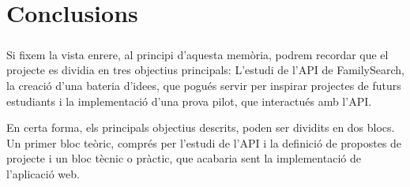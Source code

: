 \chapter{Conclusions}

    \paragraph{}
    Si fixem la vista enrere, al principi d'aquesta memòria, podrem recordar que el projecte es dividia en tres objectius principals: L'estudi de l'API de FamilySearch, la creació d'una bateria d'idees, que pogués servir per inspirar projectes de futurs estudiants i la implementació d'una prova pilot, que interactués amb l'API.

    En certa forma, els principals objectius descrits, poden ser dividits en dos blocs. Un primer bloc teòric, comprés per l’estudi de l’API i la definició de propostes de projecte i un bloc tècnic o pràctic, que acabaria sent la implementació de l’aplicació web.

    
    
    
